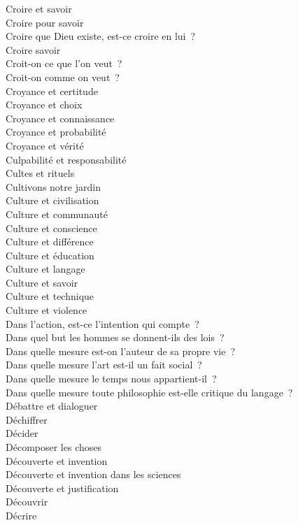 \documentclass[a4paper,12pt]{article}
\begin{document}
Croire et savoir \\
Croire pour savoir \\
Croire que Dieu existe, est-ce croire en lui ? \\
Croire savoir \\
Croit-on ce que l'on veut ? \\
Croit-on comme on veut ? \\
Croyance et certitude \\
Croyance et choix \\
Croyance et connaissance \\
Croyance et probabilité \\
Croyance et vérité \\
Culpabilité et responsabilité \\
Cultes et rituels \\
Cultivons notre jardin \\
Culture et civilisation \\
Culture et communauté \\
Culture et conscience \\
Culture et différence \\
Culture et éducation \\
Culture et langage \\
Culture et savoir \\
Culture et technique \\
Culture et violence \\
Dans l'action, est-ce l'intention qui compte ? \\
Dans quel but les hommes se donnent-ils des lois ? \\
Dans quelle mesure est-on l'auteur de sa propre vie ? \\
Dans quelle mesure l'art est-il un fait social ? \\
Dans quelle mesure le temps nous appartient-il ? \\
Dans quelle mesure toute philosophie est-elle critique du langage ? \\
Débattre et dialoguer \\
Déchiffrer \\
Décider \\
Décomposer les choses \\
Découverte et invention \\
Découverte et invention dans les sciences \\
Découverte et justification \\
Découvrir \\
Décrire \\
\end{document}
